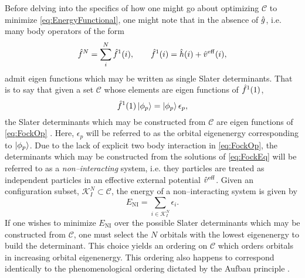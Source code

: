 Before delving into the specifics of how one might go about optimizing $\mathcal{C}$ to minimize 
\cref{eq:EnergyFunctional}, one might note that in the absence of $\hat{g}$, i.e. many body operators
of the form
\begin{equation}
\label{eq:FockOp}
\hat{f}^N = \sum_i^{N} \hat{f}^1(i), \qquad \hat{f}^1(i) = \hat{h}(i) + \hat{v}^\mathrm{eff}(i),
\end{equation}
admit eigen functions which may be written as single Slater determinants. That is to say
that given a set $\mathcal{C}$ whose elements are eigen functions of $\hat{f}^1(1)$,
\begin{equation}
\label{eq:FockEq}
\hat{f}^1(1) \left\vert \phi_p \right\rangle = \left\vert \phi_p \right\rangle \epsilon_p,
\end{equation}
the Slater determinants which may be constructed from $\mathcal{C}$ are eigen functions of
\cref{eq:FockOp} \cite{Ostlund12_book}. Here, $\epsilon_p$ will be referred to as the orbital
eigenenergy corresponding to $\left\vert \phi_p \right\rangle$. Due to the lack of explicit two body interaction
in \cref{eq:FockOp}, the determinants which may be constructed from the solutions of \cref{eq:FockEq} will be referred
to as a \emph{non--interacting} system, i.e. they particles are treated as independent particles
in an effective external potential $\hat{v}^\mathrm{eff}$. Given an configuration subset, $\mathcal{K}^{N}_I \subset \mathcal{C}$,
the energy of a non--interacting system is given by
\begin{equation}
\label{eq:NIE}
E_\mathrm{NI} = \sum_{i \in \mathcal{K}_I^{N}}  \epsilon_i.
\end{equation}
If one wishes to minimize
$E_\mathrm{NI}$ over the possible Slater determinants which may be constructed from $\mathcal{C}$,
one must select the $N$ orbitals with the lowest eigenenergy to build the determinant.
This choice yields an ordering on $\mathcal{C}$ which orders orbitals in increasing orbital eigenenergy.
This ordering also happens to correspond identically to the phenomenological ordering dictated by the
Aufbau principle .

